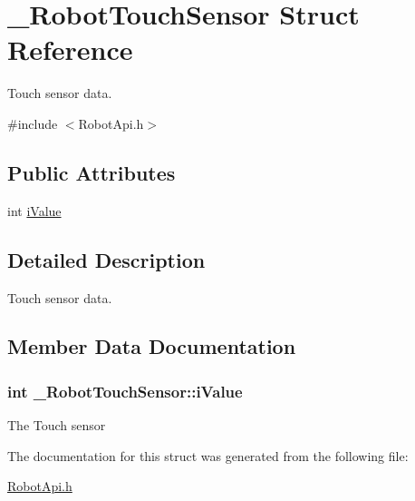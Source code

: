 \hypertarget{struct__RobotTouchSensor}{\section{\-\_\-\-Robot\-Touch\-Sensor Struct Reference}
\label{struct__RobotTouchSensor}
}


Touch sensor data.  




{\ttfamily \#include $<$Robot\-Api.\-h$>$}

\subsection*{Public Attributes}
\begin{DoxyCompactItemize}
\item 
int \hyperlink{struct__RobotTouchSensor_add5e6cd8bce6fb09abbfd6c3f09a3faa}{i\-Value}
\end{DoxyCompactItemize}


\subsection{Detailed Description}
Touch sensor data. 

\subsection{Member Data Documentation}
\hypertarget{struct__RobotTouchSensor_add5e6cd8bce6fb09abbfd6c3f09a3faa}{
\subsubsection[{i\-Value}]{\setlength{\rightskip}{0pt plus 5cm}int \-\_\-\-Robot\-Touch\-Sensor\-::i\-Value}}\label{struct__RobotTouchSensor_add5e6cd8bce6fb09abbfd6c3f09a3faa}
The Touch sensor 

The documentation for this struct was generated from the following file\-:\begin{DoxyCompactItemize}
\item 
\hyperlink{RobotApi_8h}{Robot\-Api.\-h}\end{DoxyCompactItemize}
